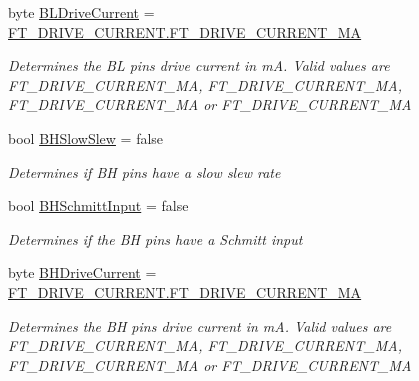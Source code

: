 \begin{DoxyCompactItemize}
byte \mbox{\hyperlink{class_f_t_d2_x_x___n_e_t_1_1_f_t_d_i_1_1_f_t2232_h___e_e_p_r_o_m___s_t_r_u_c_t_u_r_e_ad0a148a4c9ba6f97add170216388659b}{B\+L\+Drive\+Current}} = \mbox{\hyperlink{class_f_t_d2_x_x___n_e_t_1_1_f_t_d_i_1_1_f_t___d_r_i_v_e___c_u_r_r_e_n_t_af6b404bcc6f2eb88bbc95b183d5729ea}{F\+T\+\_\+\+D\+R\+I\+V\+E\+\_\+\+C\+U\+R\+R\+E\+N\+T.\+F\+T\+\_\+\+D\+R\+I\+V\+E\+\_\+\+C\+U\+R\+R\+E\+N\+T\+\_\+MA}}
\begin{DoxyCompactList}\small\item\em Determines the BL pins drive current in mA. Valid values are F\+T\+\_\+\+D\+R\+I\+V\+E\+\_\+\+C\+U\+R\+R\+E\+N\+T\+\_\+MA, F\+T\+\_\+\+D\+R\+I\+V\+E\+\_\+\+C\+U\+R\+R\+E\+N\+T\+\_\+MA, F\+T\+\_\+\+D\+R\+I\+V\+E\+\_\+\+C\+U\+R\+R\+E\+N\+T\+\_\+MA or F\+T\+\_\+\+D\+R\+I\+V\+E\+\_\+\+C\+U\+R\+R\+E\+N\+T\+\_\+MA \end{DoxyCompactList}\item 
bool \mbox{\hyperlink{class_f_t_d2_x_x___n_e_t_1_1_f_t_d_i_1_1_f_t2232_h___e_e_p_r_o_m___s_t_r_u_c_t_u_r_e_a14514bd669238d7d624f93fc0dd2a9b3}{B\+H\+Slow\+Slew}} = false
\begin{DoxyCompactList}\small\item\em Determines if BH pins have a slow slew rate \end{DoxyCompactList}\item 
bool \mbox{\hyperlink{class_f_t_d2_x_x___n_e_t_1_1_f_t_d_i_1_1_f_t2232_h___e_e_p_r_o_m___s_t_r_u_c_t_u_r_e_ad3f1dbe27b8e4d8c008cb0ae55f61ff7}{B\+H\+Schmitt\+Input}} = false
\begin{DoxyCompactList}\small\item\em Determines if the BH pins have a Schmitt input \end{DoxyCompactList}\item 
byte \mbox{\hyperlink{class_f_t_d2_x_x___n_e_t_1_1_f_t_d_i_1_1_f_t2232_h___e_e_p_r_o_m___s_t_r_u_c_t_u_r_e_a5abab98605d950e514a1cfff2cc5e74d}{B\+H\+Drive\+Current}} = \mbox{\hyperlink{class_f_t_d2_x_x___n_e_t_1_1_f_t_d_i_1_1_f_t___d_r_i_v_e___c_u_r_r_e_n_t_af6b404bcc6f2eb88bbc95b183d5729ea}{F\+T\+\_\+\+D\+R\+I\+V\+E\+\_\+\+C\+U\+R\+R\+E\+N\+T.\+F\+T\+\_\+\+D\+R\+I\+V\+E\+\_\+\+C\+U\+R\+R\+E\+N\+T\+\_\+MA}}
\begin{DoxyCompactList}\small\item\em Determines the BH pins drive current in mA. Valid values are F\+T\+\_\+\+D\+R\+I\+V\+E\+\_\+\+C\+U\+R\+R\+E\+N\+T\+\_\+MA, F\+T\+\_\+\+D\+R\+I\+V\+E\+\_\+\+C\+U\+R\+R\+E\+N\+T\+\_\+MA, F\+T\+\_\+\+D\+R\+I\+V\+E\+\_\+\+C\+U\+R\+R\+E\+N\+T\+\_\+MA or F\+T\+\_\+\+D\+R\+I\+V\+E\+\_\+\+C\+U\+R\+R\+E\+N\+T\+\_\+MA \end{DoxyCompactList}\item 

\end{DoxyCompactItemize}
